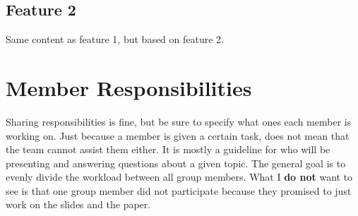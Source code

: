 \documentclass[11pt]{article}
\begin{document}
\subsection{Feature 2}
Same content as feature 1, but based on feature 2.

\section{Member Responsibilities}
Sharing responsibilities is fine, but be sure to specify what ones each member is working on. Just because a member is given a certain task, does not mean that the team cannot assist them either. It is mostly a guideline for who will be presenting and answering questions about a given topic. The general goal is to evenly divide the workload between all group members. What I \textbf{do not} want to see is that one group member did not participate because they promised to just work on the slides and the paper. 



\end{document}
